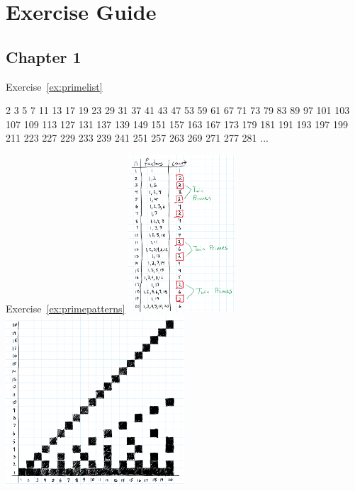 

\chapter{Exercise Guide}

\section{Chapter 1} 

Exercise~\ref{ex:primelist}

2	3	5	7	11	13	17	19	23	29
31	37	41	43	47	53	59	61	67	71
73	79	83	89	97	101	103	107	109	113
127	131	137	139	149	151	157	163	167	173
179	181	191	193	197	199	211	223	227	229
233	239	241	251	257	263	269	271	277	281 ... 


Exercise~\ref{ex:primepatterns}
\includegraphics[width=0.3\textwidth]{img/factor-table.png}
\includegraphics[width=0.5\textwidth]{img/factor-grid.png}
